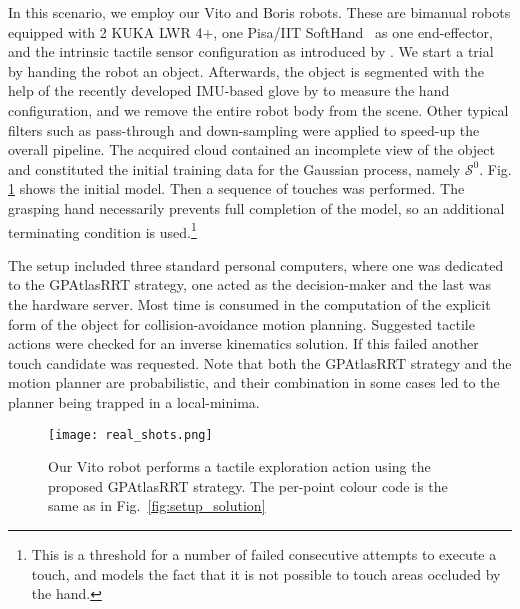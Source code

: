 In this scenario, we employ our Vito and Boris robots. These are bimanual robots equipped with 2 KUKA LWR 4+, one Pisa/IIT SoftHand~\cite{Catalano2014Adaptive} as one end-effector, and the intrinsic tactile sensor configuration as introduced by \cite{Rosales2014Active}. We start a trial by handing the robot an object. Afterwards, the object is segmented with the help of the recently developed IMU-based glove by \cite{Santaera2015Lowcost} to measure the hand configuration, and we remove the entire robot body from the scene. Other typical filters such as pass-through and down-sampling were applied to speed-up the overall pipeline. The acquired cloud contained an incomplete view of the object and constituted the initial training data for the Gaussian process, namely $\mathcal{S}^0$. Fig. \ref{fig:real} shows the initial model. Then a sequence of touches was performed. The grasping hand necessarily prevents full completion of the model, so an additional terminating condition is used.\footnote{This is a threshold for a number of failed consecutive attempts to execute a touch, and models the fact that it is not possible to touch areas occluded by the hand.} 

The setup included three standard personal computers, where one was dedicated to the GPAtlasRRT strategy, one acted as the decision-maker and the last was the hardware server. Most time is consumed in the computation of the explicit form of the object for collision-avoidance motion planning. Suggested tactile actions were checked for an inverse kinematics solution. If this failed another touch candidate was requested. Note that both the GPAtlasRRT strategy and the motion planner are probabilistic, and their combination in some cases led to the planner being trapped in a local-minima.

\begin{figure}
\centering
  \texttt{[image: real\_shots.png]}
\caption{Our Vito robot performs a tactile exploration action using the proposed GPAtlasRRT strategy. The per-point colour code  is the same as in Fig.~\ref{fig:setup_solution}}
\label{fig:real}
\end{figure}